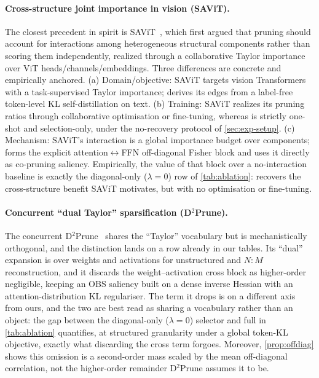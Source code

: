 \paragraph{Cross-structure joint importance in vision (SAViT).} The closest precedent in spirit
is SAViT~\citep{zheng2022savit}, which first argued that pruning should account for interactions among
heterogeneous structural components rather than scoring them independently, realized through a
collaborative Taylor importance over ViT heads/channels/embeddings. Three differences are concrete and
empirically anchored. (a) Domain/objective: SAViT targets vision Transformers with a
task-supervised Taylor importance; \method derives its edges from a label-free token-level KL
self-distillation on text. (b) Training: SAViT realizes its pruning ratios through collaborative
optimisation or fine-tuning, whereas \method is strictly one-shot and selection-only, under the
no-recovery protocol of \cref{sec:exp-setup}. (c) Mechanism: SAViT's interaction is a global
importance budget over components; \method forms the explicit attention$\leftrightarrow$FFN
off-diagonal Fisher block and uses it directly as co-pruning saliency. Empirically, the value of
that block over a no-interaction baseline is exactly the diagonal-only ($\lambda{=}0$) row of
\cref{tab:ablation}: \method recovers the cross-structure benefit SAViT motivates, but with no
optimisation or fine-tuning.

\paragraph{Concurrent ``dual Taylor'' sparsification (D$^2$Prune).} The concurrent
D$^2$Prune~\citep{xiong2026d2prune} shares the ``Taylor'' vocabulary but is mechanistically orthogonal,
and the distinction lands on a row already in our tables. Its ``dual'' expansion is over weights and activations for unstructured and $N{:}M$ reconstruction, and
it discards the weight--activation cross block as higher-order negligible, keeping an OBS saliency built
on a dense inverse Hessian with an attention-distribution KL regulariser. The term it drops is on a
different axis from ours, and the two are best read as sharing a vocabulary rather than an object: the gap between the diagonal-only ($\lambda{=}0$) selector and full \method in
\cref{tab:ablation} quantifies, at structured
granularity under a global token-KL objective, exactly what discarding the cross term forgoes. Moreover,
\cref{prop:offdiag} shows this omission is a second-order mass scaled by the mean off-diagonal
correlation, not the higher-order remainder D$^2$Prune assumes it to be.

